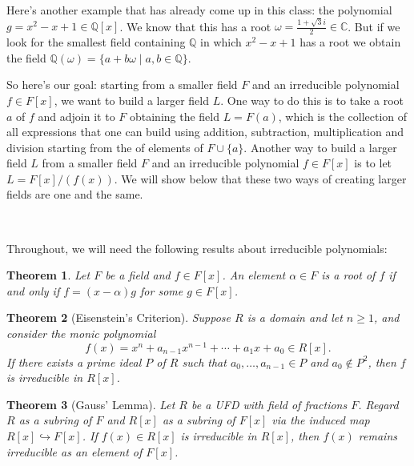 \documentclass[12pt]{report}
\newtheorem{theorem}{Theorem}[chapter]
\numberwithin{equation}{section}
\numberwithin{theorem}{chapter}
\theoremstyle{definition}
\newtheorem*{basic properties}{Basic Properties}
\newtheorem*{Important Remark}{Important Remark}
\newcommand{\C}{\mathbb{C}}
\begin{document}
Here's another example that has already come up in this class: the polynomial $g=x^2-x+1 \in \mathbb{Q}[x]$. We know that this has a root $\omega = \frac{1 + \sqrt{3}i}{2}\in \C$. But if we look for the smallest field containing $\mathbb{Q}$ in which $x^2-x+1$ has a root we obtain the field $\mathbb{Q}(\omega)=\{a+b\omega \mid a,b\in \mathbb{Q}\}$.

So here's our goal: starting from a smaller field $F$ and an irreducible polynomial $f\in F[x]$, we want to build a larger field $L$. One way to do this is to take a root $a$ of $f$ and adjoin it to $F$ obtaining the field $L=F(a)$, which is the collection of all expressions that one can build using addition, subtraction, multiplication and division starting from the of elements of $F\cup\{a\}$.
Another way to build a larger field $L$ from a smaller field $F$ and an irreducible polynomial $f\in F[x]$ is to
let $L=F[x]/(f(x))$. We will show below that these two ways of creating larger fields are one and the same.



\


Throughout, we will need the following results about irreducible polynomials:


\begin{theorem}
	Let $F$ be a field and $f \in F[x]$. An element $\alpha \in F$ is a root of $f$ if and only if $f = (x-\alpha) g$ for some $g \in F[x]$.
\end{theorem}

\begin{theorem}[Eisenstein's Criterion]\label{eisenstein criterion}
Suppose $R$ is a domain and let $n \geqslant 1$, and consider the monic polynomial
$$f(x) = x^n + a_{n-1} x^{n-1} + \cdots + a_1 x + a_0 \in R[x].$$
If there exists a prime ideal $P$ of $R$ such that $a_0, \dots, a_{n-1} \in P$ and $a_0 \notin P^2$, then $f$ is irreducible in $R[x]$.
\end{theorem}


\begin{theorem}[Gauss' Lemma]\label{Gauss Lemma}
Let $R$ be a UFD  with field of fractions $F$. Regard $R$ as a subring of $F$ and $R[x]$ as a subring of $F[x]$ via the induced map $R[x]\hookrightarrow F[x]$.
If $f(x) \in R[x]$ is irreducible  in $R[x]$,  then $f(x)$ remains irreducible  as an element of $F[x]$.
\end{theorem}
\end{document}

